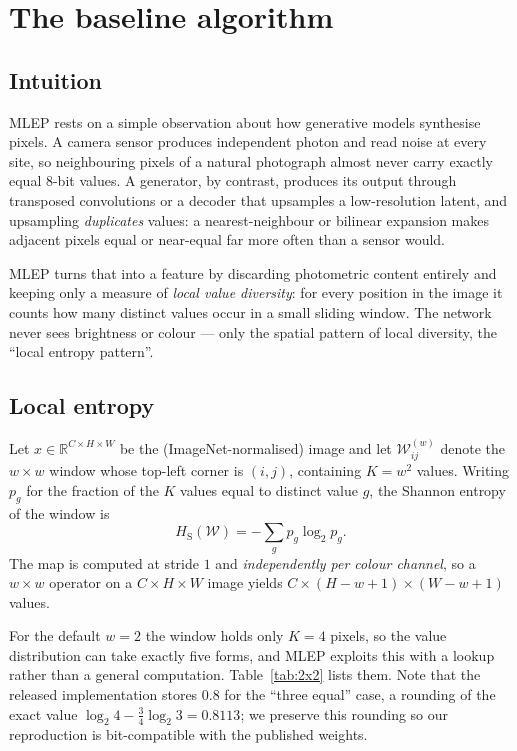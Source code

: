\section{The baseline algorithm}
\label{sec:algorithm}

\subsection{Intuition}

MLEP rests on a simple observation about how generative models synthesise
pixels. A camera sensor produces independent photon and read noise at every
site, so neighbouring pixels of a natural photograph almost never carry exactly
equal 8-bit values. A generator, by contrast, produces its output through
transposed convolutions or a decoder that upsamples a low-resolution latent, and
upsampling \emph{duplicates} values: a nearest-neighbour or bilinear expansion
makes adjacent pixels equal or near-equal far more often than a sensor would.

MLEP turns that into a feature by discarding photometric content entirely and
keeping only a measure of \emph{local value diversity}: for every position in the
image it counts how many distinct values occur in a small sliding window. The
network never sees brightness or colour --- only the spatial pattern of local
diversity, the ``local entropy pattern''.

\subsection{Local entropy}

Let $x \in \mathbb{R}^{C \times H \times W}$ be the (ImageNet-normalised) image
and let $\mathcal{W}_{ij}^{(w)}$ denote the $w \times w$ window whose top-left
corner is $(i,j)$, containing $K = w^2$ values. Writing $p_g$ for the fraction
of the $K$ values equal to distinct value $g$, the Shannon entropy of the window
is
\begin{equation}
  H_{\text{S}}(\mathcal{W}) = -\sum_{g} p_g \log_2 p_g .
  \label{eq:shannon}
\end{equation}
The map is computed at stride $1$ and \emph{independently per colour channel},
so a $w\times w$ operator on a $C\times H\times W$ image yields
$C \times (H-w+1) \times (W-w+1)$ values.

For the default $w=2$ the window holds only $K=4$ pixels, so the value
distribution can take exactly five forms, and MLEP exploits this with a lookup
rather than a general computation. Table~\ref{tab:2x2} lists them. Note that the
released implementation stores $0.8$ for the ``three equal'' case, a rounding of
the exact value $\log_2 4 - \tfrac{3}{4}\log_2 3 = 0.8113$; we preserve this
rounding so our reproduction is bit-compatible with the published weights.

